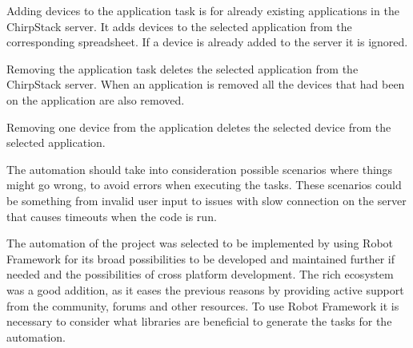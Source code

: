 Adding devices to the application task is for already existing applications in the ChirpStack server.
It adds devices to the selected application from the corresponding spreadsheet.
If a device is already added to the server it is ignored.

Removing the application task deletes the selected application from the ChirpStack server.
When an application is removed all the devices that had been on the application are also removed.

Removing one device from the application deletes the selected device from the selected application.

The automation should take into consideration possible scenarios where things might go wrong, to avoid errors when executing the tasks.
These scenarios could be something from invalid user input to issues with slow connection on the server that causes timeouts when the code is run.

The automation of the  project was selected to be implemented by using Robot Framework for its broad possibilities to be developed and maintained further if needed and the possibilities of cross platform development.
The rich ecosystem was a good addition, as it eases the previous reasons by providing active support from the community, forums and other resources.
To use Robot Framework it is necessary to consider what libraries are beneficial to generate the tasks for the automation.


\clearpage %
